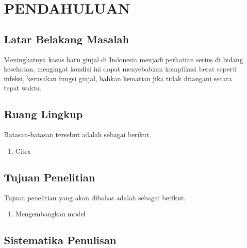\chapter{PENDAHULUAN}

\setcounter{page}{1}
\thispagestyle{plain}
\pagestyle{arabicstyle}

\section{Latar Belakang Masalah}

Meningkatnya kasus batu ginjal di Indonesia menjadi perhatian serius
di bidang kesehatan, mengingat kondisi ini dapat menyebabkan komplikasi
berat seperti infeksi, kerusakan fungsi ginjal, bahkan kematian jika
tidak ditangani secara tepat waktu.

\section{Ruang Lingkup}

Batasan-batasan tersebut adalah sebagai berikut.
\begin{enumerate}
\item Citra
\end{enumerate}

\section{Tujuan Penelitian}

Tujuan penelitian yang akan dibahas adalah sebagai berikut.
\begin{enumerate}
\item Mengembangkan model
\end{enumerate}

\section{Sistematika Penulisan}

